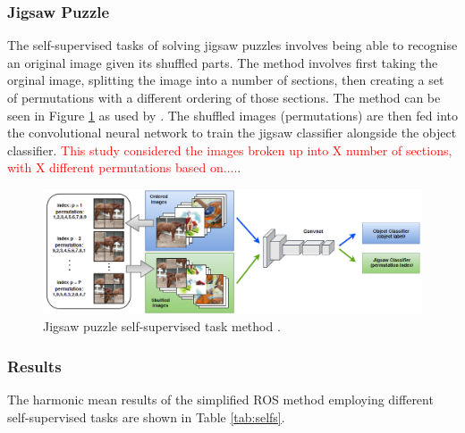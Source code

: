 \documentclass[10pt,twocolumn,letterpaper]{article}
\begin{document}
\subsubsection*{Jigsaw Puzzle}

The self-supervised tasks of solving jigsaw puzzles involves being able to recognise an original image given its shuffled parts. The method involves first taking the orginal image, splitting the image into a number of sections, then creating a set of permutations with a different ordering of those sections. The method can be seen in Figure \ref{fig:jigsaw} as used by \cite{Carlucci2019}. The shuffled images (permutations) are then fed into the convolutional neural network to train the jigsaw classifier alongside the object classifier. \textcolor{red}{This study considered the images broken up into X number of sections, with X different permutations based on....}.

\begin{figure}[!htbp]
  \centering
   \includegraphics[width=0.95\linewidth]{Figures/Jigsaw.png}
   \caption{Jigsaw puzzle self-supervised task method \cite{Carlucci2019}.}
   \label{fig:jigsaw}
\end{figure}

\subsubsection*{Results}

The harmonic mean results of the simplified ROS method employing different self-supervised tasks are shown in Table \ref{tab:selfs}.
\end{document}
